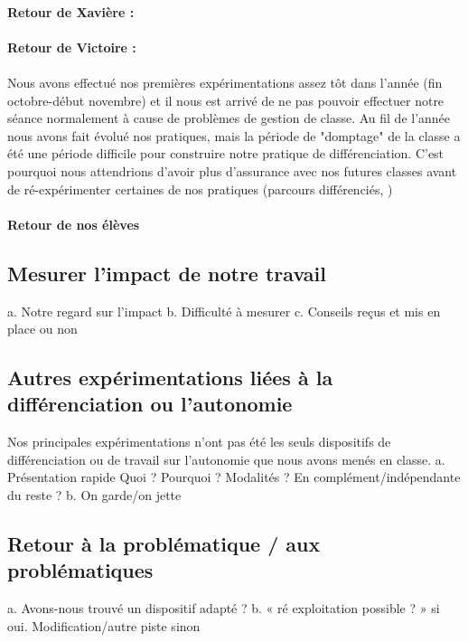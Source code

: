 \paragraph*{Retour de Xavière :}

\paragraph*{Retour de Victoire :}

\paragraph*{}
Nous avons effectué nos premières expérimentations assez tôt dans l'année (fin octobre-début novembre) et il nous est arrivé de ne pas pouvoir effectuer notre séance normalement à cause de problèmes de gestion de classe. Au fil de l'année nous avons fait évolué nos pratiques, mais la période de "domptage"  de la classe a été une période difficile pour construire notre pratique de différenciation. C'est pourquoi nous  attendrions d'avoir plus d'assurance  avec nos futures classes avant de ré-expérimenter certaines de nos pratiques (parcours différenciés, )
\paragraph*{Retour de nos élèves}
\subsection{Mesurer l’impact de notre travail}
a.	Notre regard sur l’impact
b.	Difficulté à mesurer
c.	Conseils reçus et mis en place ou non
\subsection{Autres expérimentations liées à la différenciation ou l’autonomie}
Nos principales expérimentations n'ont pas été les seuls dispositifs de différenciation ou de travail sur l'autonomie que nous avons menés en classe.
a.	Présentation rapide
Quoi ? Pourquoi ? Modalités ? En complément/indépendante du reste ?
b.	On garde/on jette
\subsection{Retour à la problématique / aux problématiques}
a.	Avons-nous trouvé un dispositif adapté ?
b.	« ré exploitation possible ? » si oui. Modification/autre piste sinon
